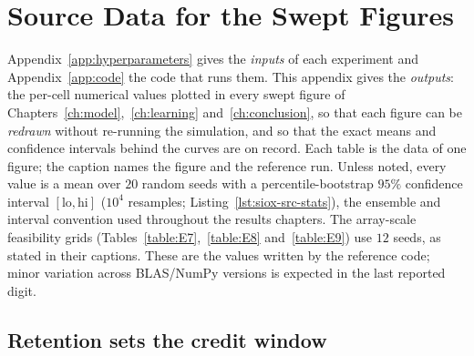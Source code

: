 \chapter{Source Data for the Swept Figures}
\label{app:sourcedata}

\noindent Appendix~\ref{app:hyperparameters} gives the \emph{inputs} of each experiment
and Appendix~\ref{app:code} the code that runs them. This appendix gives the
\emph{outputs}: the per-cell numerical values plotted in every swept figure of
Chapters~\ref{ch:model},~\ref{ch:learning} and~\ref{ch:conclusion}, so that each figure
can be \emph{redrawn} without re-running the simulation, and so that the exact means and
confidence intervals behind the curves are on record. Each table is the data of one
figure; the caption names the figure and the reference run. Unless noted, every value
is a mean over $20$ random seeds with a percentile-bootstrap $95\%$ confidence interval
$[\text{lo},\text{hi}]$ ($10^4$ resamples; Listing~\ref{lst:siox-src-stats}), the ensemble and
interval convention used throughout the results chapters. The array-scale feasibility
grids (Tables~\ref{table:E7},~\ref{table:E8} and~\ref{table:E9}) use $12$ seeds, as
stated in their captions. These are the values written by the reference code; minor variation across
BLAS/NumPy versions is expected in the last reported digit.

\section{Retention sets the credit window}

